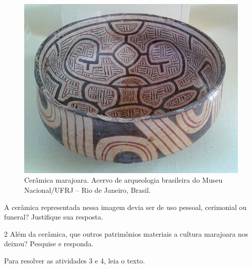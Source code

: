 \begin{figure}[htpb!]
\includegraphics[width=\textwidth]{./imgs/art24.jpg}
\caption{Cerâmica marajoara. Acervo de arqueologia brasileira do Museu
Nacional/UFRJ – Rio de Janeiro, Brasil.}
\end{figure}

A cerâmica representada nessa imagem devia ser de uso pessoal, cerimonial ou funeral? Justifique sua resposta.



\num{2}  Além da cerâmica, que outros patrimônios materiais a cultura marajoara nos deixou? Pesquise e responda.



Para resolver as atividades 3 e 4, leia o texto.

